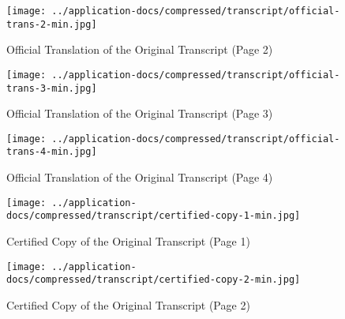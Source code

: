 \vspace*{\fill}
\begin{figure}[H]
    \centering
    \texttt{[image: ../application-docs/compressed/transcript/official-trans-2-min.jpg]}
    \caption{Official Translation of the Original Transcript (Page 2)}
    \label{fig:official-trans-transcript-2}
\end{figure}
\vspace*{\fill}

\clearpage

\vspace*{\fill}
\begin{figure}[H]
    \centering
    \texttt{[image: ../application-docs/compressed/transcript/official-trans-3-min.jpg]}
    \caption{Official Translation of the Original Transcript (Page 3)}
    \label{fig:official-trans-transcript-3}
\end{figure}
\vspace*{\fill}

\clearpage

\vspace*{\fill}
\begin{figure}[H]
    \centering
    \texttt{[image: ../application-docs/compressed/transcript/official-trans-4-min.jpg]}
    \caption{Official Translation of the Original Transcript (Page 4)}
    \label{fig:official-trans-transcript-4}
\end{figure}
\vspace*{\fill}

\clearpage

\vspace*{\fill}
\begin{figure}[H]
    \centering
    \texttt{[image: ../application-docs/compressed/transcript/certified-copy-1-min.jpg]}
    \caption{Certified Copy of the Original Transcript (Page 1)}
    \label{fig:certified-copy-transcript-1}
\end{figure}
\vspace*{\fill}

\clearpage

\vspace*{\fill}
\begin{figure}[H]
    \centering
    \texttt{[image: ../application-docs/compressed/transcript/certified-copy-2-min.jpg]}
    \caption{Certified Copy of the Original Transcript (Page 2)}
    \label{fig:certified-copy-transcript-2}
\end{figure}
\vspace*{\fill}

